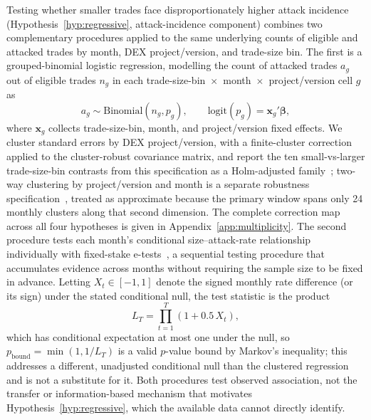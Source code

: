 \documentclass[pdflatex, sn-basic]{sn-jnl}
\theoremstyle{thmstylethree}%
\begin{document}
    Testing whether smaller trades face disproportionately higher attack incidence (Hypothesis~\ref{hyp:regressive}, attack-incidence component) combines two complementary procedures applied to the same underlying counts of eligible and attacked trades by month, DEX project/version, and trade-size bin.
    The first is a grouped-binomial logistic regression, modelling the count of attacked trades $a_g$ out of eligible trades $n_g$ in each trade-size-bin~$\times$~month~$\times$~project/version cell $g$ as
    \begin{equation}
    a_g \sim \mathrm{Binomial}(n_g, p_g), \qquad \mathrm{logit}(p_g) = \mathbf{x}_g' \boldsymbol{\beta},
    \label{eq:groupedbinomial}
    \end{equation}
    where $\mathbf{x}_g$ collects trade-size-bin, month, and project/version fixed effects.
    We cluster standard errors by DEX project/version, with a finite-cluster correction applied to the cluster-robust covariance matrix, and report the ten small-vs-larger trade-size-bin contrasts from this specification as a Holm-adjusted family~\citep{Holm1979}; two-way clustering by project/version and month is a separate robustness specification~\citep{CameronMiller2015}, treated as approximate because the primary window spans only \num{24} monthly clusters along that second dimension. The complete correction map across all four hypotheses is given in Appendix~\ref{app:multiplicity}.
    The second procedure tests each month's conditional size--attack-rate relationship individually with fixed-stake e-tests~\citep{HowardEtAl2021,WaudbySmithRamdas2024}, a sequential testing procedure that accumulates evidence across months without requiring the sample size to be fixed in advance.
    Letting $X_t \in [-1,1]$ denote the signed monthly rate difference (or its sign) under the stated conditional null, the test statistic is the product
    \begin{equation}
    L_T = \prod_{t=1}^{T} \left(1 + 0.5\, X_t\right),
    \label{eq:etest}
    \end{equation}
    which has conditional expectation at most one under the null, so $p_{\text{bound}} = \min(1, 1/L_T)$ is a valid $p$-value bound by Markov's inequality; this addresses a different, unadjusted conditional null than the clustered regression and is not a substitute for it.
    Both procedures test observed association, not the transfer or information-based mechanism that motivates Hypothesis~\ref{hyp:regressive}, which the available data cannot directly identify.
    
\end{document}
